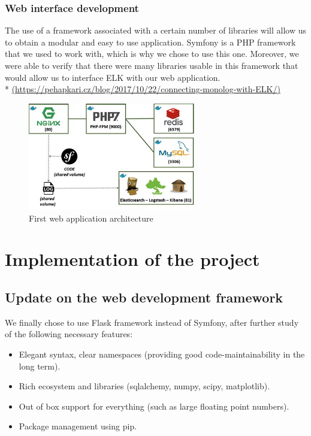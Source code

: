 \subsubsection{Web interface development}

The use of a framework associated with a certain number of libraries will
allow us to obtain a modular and easy to use application.
Symfony is a PHP framework that we used to work with, which is why we chose
to use this one. Moreover, we were able to verify that there were many
libraries usable in this framework that would allow us to interface ELK with our web
application. \\ *
\url{(https://pehapkari.cz/blog/2017/10/22/connecting-monolog-with-ELK/)}\\

\begin{figure}[!h]
  \centering
  \includegraphics[width=0.65\textwidth]{images/symfony-example.jpg}
  \caption{First web application architecture}
  \label{Symfony}
\end{figure}

\pagebreak

\section{Implementation of the project}

\subsection{Update on the web development framework}

We finally chose to use Flask framework instead of Symfony, after further study of the following necessary features:
\begin{itemize}
    \item Elegant syntax, clear namespaces (providing good code-maintainability in the long term).
    \item Rich ecosystem and libraries (sqlalchemy, numpy, scipy, matplotlib).
    \item Out of box support for everything (such as large floating point numbers).
    \item Package management using pip.
\end{itemize}

